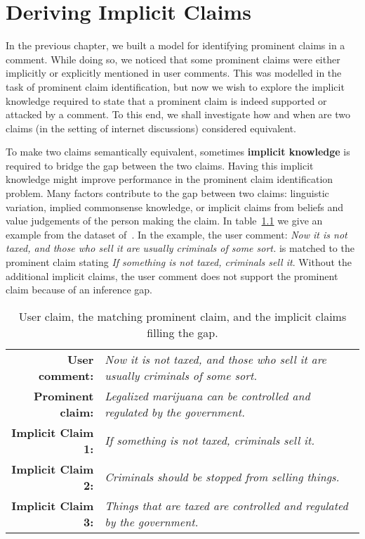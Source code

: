 \chapter{Deriving Implicit Claims}
\label{chap:deriving_implicit}

In the previous chapter, we built a model for identifying 
prominent claims in a comment. While doing so, we noticed that 
some prominent claims were either implicitly or explicitly mentioned
in user comments. This was modelled in the task of prominent claim
identification, but now we wish to explore the implicit knowledge required
to state that a prominent claim is indeed supported or attacked by a comment.
To this end, we shall investigate how and when are two claims
(in the setting of internet discussions) considered equivalent. 

To make two claims semantically equivalent, sometimes \textbf{implicit knowledge} is
required to bridge the gap between the two claims. 
Having this implicit knowledge might improve performance in the 
prominent claim identification problem. 
Many factors contribute to the gap between two claims: linguistic variation,
implied commonsense knowledge, or implicit claims from beliefs and value
judgements of the person making the claim. In table~\ref{tab:premise_example} we
give an example from the dataset of~\citet{hasan2014you}. 
In the example, the user comment: 
\emph{Now it is not taxed, and those who sell it are usually criminals of some sort.}
is matched to  the prominent claim stating
\emph{If something is not taxed, criminals sell it}.
Without the additional implicit claims, the user comment does not support the prominent 
claim because of an inference gap. 


\begin{table}
{\normalsize
\begin{tabular}{|@{\ }r@{\ \  }p{}|}
\hline
\textbf{User comment:} & \emph{Now it is not taxed, and those who sell it are
	usually criminals of some sort.}\\
\textbf{Prominent claim:} & \emph{Legalized marijuana can be controlled and
	regulated by the government.}\\
\textbf{Implicit Claim 1:} & \emph{If something is not taxed, criminals sell
	it.}\\
\textbf{Implicit Claim 2:} & \emph{Criminals should be stopped from selling
	things.}\\
\textbf{Implicit Claim 3:} & \emph{Things that are taxed are controlled and
	regulated by the government.}\\
\hline
\end{tabular}}
\caption{User claim, the matching prominent claim, and the implicit claims filling the gap.}
\label{tab:premise_example}
\end{table}

